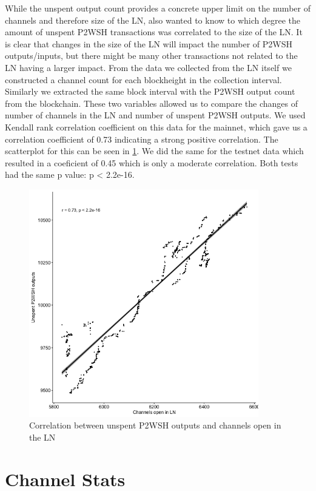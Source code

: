 While the unspent output count provides a concrete upper limit on the number of channels and therefore size of the LN, also wanted to know to which degree the amount of unspent P2WSH transactions was correlated to the size of the LN. It is clear that changes in the size of the LN will impact the number of P2WSH outputs/inputs, but there might be many other transactions not related to the LN having a larger impact. From the data we collected from the LN itself we constructed a channel count for each blockheight in the collection interval. Similarly we extracted the same block interval with the P2WSH output count from the blockchain. These two variables allowed us to compare the changes of number of channels in the LN and number of unspent P2WSH outputs. We used Kendall rank correlation coefficient  on this data for the mainnet, which gave us a correlation coefficient of 0.73 indicating a strong positive correlation. The scatterplot for this can be seen in \cref{fig:correlation}.
We did the same for the testnet data which resulted in a coeficient of 0.45 which is only a moderate correlation. Both tests had the same p value: p < 2.2e-16.

\begin{figure}[t]
    \centering
    \includegraphics[width=10cm]{figures/graphs/channel_p2wsh_correlation_mainnnet.png}
    \caption{Correlation between unspent P2WSH outputs and channels open in the LN}
    \label{fig:correlation}
\end{figure}


\section{Channel Stats}

